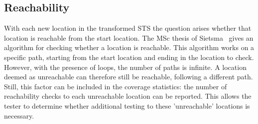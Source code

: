 \subsection{Reachability}\label{sec:reachability}
With each new location in the transformed STS the question arises whether that location is reachable from the start location. The MSc thesis of Sietsma~\cite{Sietsma:reachability} gives an algorithm for checking whether a location is reachable. This algorithm works on a specific path, starting from the start location and ending in the location to check. However, with the presence of loops, the number of paths is infinite. A location deemed as unreachable can therefore still be reachable, following a different path. Still, this factor can be included in the coverage statistics: the number of reachability checks to each unreachable location can be reported. This allows the tester to determine whether additional testing to these 'unreachable' locations is necessary.
